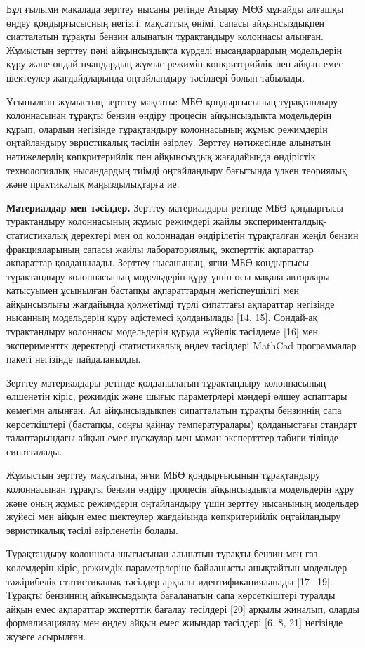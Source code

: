 Бұл ғылыми мақалада зерттеу нысаны ретінде Атырау МӨЗ мұнайды алғашқы
өңдеу қондырғысысның негізгі, мақсаттық өнімі, сапасы айқынсыздықпен
сиатталатын тұрақты бензин алынатын тұрақтандыру колоннасы алынған.
Жұмыстың зерттеу пәні айқынсыздықта күрделі нысандардардың модельдерін
құру және ондай нчандардың жұмыс режимін көпкритерийлік пен айқын емес
шектеулер жағдайдларында оңтайландыру тәсілдері болып табылады.

Ұсынылған жұмыстың зерттеу мақсаты: МБӨ қондырғысының тұрақтандыру
колоннасынан тұрақты бензин өндіру процесін айқынсыздықта модельдерін
құрып, олардың негізінде тұрақтандыру колоннасының жұмыс режимдерін
оңтайландыру эвристикалық тәсілін әзірлеу. Зерттеу нәтижесінде алынатын
нәтижелердің көпкритерийлік пен айқынсыздық жағадайында өндірістік
технологиялық нысандардың тиімді оңтайландыру бағытында үлкен теориялық
және практикалық маңыздылықтарға ие.

{\bfseries Материалдар мен тәсілдер.} Зерттеу материалдары ретінде МБӨ
қондырғысы турақтандыру колоннасының жұмыс режимдері жайлы
эксперименталдық-статистикалық деректері мен ол колоннадан өндірілетін
тұрақталған жеңіл бензин фракцияларының сапасы жайлы лабораториялық,
эксперттік ақпараттар ақпараттар қолданылады. Зерттеу нысанының, яғни
МБӨ қондырғысы тұрақтандыру колоннасының модельдерін құру үшін осы
мақала авторлары қатысуымен ұсынылған бастапқы ақпараттардың
жетіспеушілігі мен айқынсызлығы жағдайында қолжетімді түрлі сипаттағы
ақпараттар негізінде нысанның модельдерін құру әдістемесі қолданылады
{[}14, 15{]}. Сондай-ақ тұрақтандыру колоннасы модельдерін құруда
жүйелік тәсілдеме {[}16{]} мен эксперименттк деректерді статистикалық
өңдеу тәсілдері MathCad программалар пакеті негізінде пайдаланылды.

Зерттеу материалдары ретінде қолданылатын тұрақтандыру колоннасының
өлшенетін кіріс, режимдік және шығыс параметрлері мәндері өлшеу
аспаптары көмегімн алынған. Ал айқынсыздықпен сипатталатын тұрақты
бензиннің сапа көрсеткіштері (бастапқы, соңғы қайнау температуралары)
қолданыстағы стандарт талаптарындағы айқын емес нұсқаулар мен
маман-экспертттер табиғи тілінде сипатталады.

Жұмыстың зерттеу мақсатына, яғни МБӨ қондырғысының тұрақтандыру
колоннасынан тұрақты бензин өндіру процесін айқынсыздықта модельдерін
құру және оның жұмыс режимдерін оңтайландыру үшін зерттеу нысанының
модельдер жүйесі мен айқын емес шектеулер жағдайында көпкритерийлік
оңтайландыру эвристикалық тәсілі әзірленетін болады.

Тұрақтандыру колоннасы шығысынан алынатын тұрақты бензин мен газ
көлемдерін кіріс, режимдік параметрлеріне байланысты анықтайтын
модельдер тәжірибелік-статистикалық тәсілдер арқылы идентификацияланады
{[}17−19{]}. Тұрақты бензиннің айқынсыздықта бағаланатын сапа
көрсеткіштері туралды айқын емес ақпараттар эксперттік бағалау тәсілдері
{[}20{]} арқылы жиналып, оларды формализациялау мен өңдеу айқын емес
жиындар тәсілдері {[}6, 8, 21{]} негізінде жүзеге асырылған.

